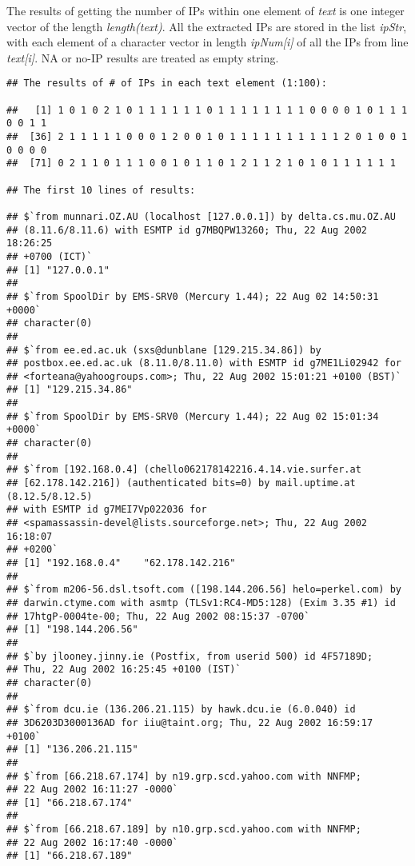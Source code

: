 \documentclass{article}\usepackage{graphicx, color}
\makeatletter
\newenvironment{kframe}{%
 \def\at@end@of@kframe{}%
 \ifinner\ifhmode%
  \def\at@end@of@kframe{\end{minipage}}%
  \begin{minipage}{\columnwidth}%
 \fi\fi%
 \def\FrameCommand##1{\hskip\@totalleftmargin \hskip-\fboxsep
 \colorbox{shadecolor}{##1}\hskip-\fboxsep
     \hskip-\linewidth \hskip-\@totalleftmargin \hskip\columnwidth}%
 \MakeFramed {\advance\hsize-\width
   \@totalleftmargin\z@ \linewidth\hsize
   \@setminipage}}%
 {\par\unskip\endMakeFramed%
 \at@end@of@kframe}
\newenvironment{knitrout}{}{} %
\makeatother
\begin{document}
The results of getting the number of IPs within one element of \textit{text} is one integer vector of 
the length \textit{length(text)}. All the extracted IPs are stored in the list \textit{ipStr}, 
with each element of a character vector in length \textit{ipNum[i]} of all the IPs from line \textit{text[i]}.
NA or no-IP results are treated as empty string.

\begin{knitrout}
\color{fgcolor}\begin{kframe}
\begin{verbatim}
## The results of # of IPs in each text element (1:100):

##   [1] 1 0 1 0 2 1 0 1 1 1 1 1 1 0 1 1 1 1 1 1 1 1 0 0 0 0 1 0 1 1 1 0 0 1 1
##  [36] 2 1 1 1 1 1 0 0 0 1 2 0 0 1 0 1 1 1 1 1 1 1 1 1 1 2 0 1 0 0 1 0 0 0 0
##  [71] 0 2 1 1 0 1 1 1 0 0 1 0 1 1 0 1 2 1 1 2 1 0 1 0 1 1 1 1 1 1

## The first 10 lines of results:

## $`from munnari.OZ.AU (localhost [127.0.0.1]) by delta.cs.mu.OZ.AU
## (8.11.6/8.11.6) with ESMTP id g7MBQPW13260; Thu, 22 Aug 2002 18:26:25
## +0700 (ICT)`
## [1] "127.0.0.1"
## 
## $`from SpoolDir by EMS-SRV0 (Mercury 1.44); 22 Aug 02 14:50:31 +0000`
## character(0)
## 
## $`from ee.ed.ac.uk (sxs@dunblane [129.215.34.86]) by
## postbox.ee.ed.ac.uk (8.11.0/8.11.0) with ESMTP id g7ME1Li02942 for
## <forteana@yahoogroups.com>; Thu, 22 Aug 2002 15:01:21 +0100 (BST)`
## [1] "129.215.34.86"
## 
## $`from SpoolDir by EMS-SRV0 (Mercury 1.44); 22 Aug 02 15:01:34 +0000`
## character(0)
## 
## $`from [192.168.0.4] (chello062178142216.4.14.vie.surfer.at
## [62.178.142.216]) (authenticated bits=0) by mail.uptime.at (8.12.5/8.12.5)
## with ESMTP id g7MEI7Vp022036 for
## <spamassassin-devel@lists.sourceforge.net>; Thu, 22 Aug 2002 16:18:07
## +0200`
## [1] "192.168.0.4"    "62.178.142.216"
## 
## $`from m206-56.dsl.tsoft.com ([198.144.206.56] helo=perkel.com) by
## darwin.ctyme.com with asmtp (TLSv1:RC4-MD5:128) (Exim 3.35 #1) id
## 17htgP-0004te-00; Thu, 22 Aug 2002 08:15:37 -0700`
## [1] "198.144.206.56"
## 
## $`by jlooney.jinny.ie (Postfix, from userid 500) id 4F57189D;
## Thu, 22 Aug 2002 16:25:45 +0100 (IST)`
## character(0)
## 
## $`from dcu.ie (136.206.21.115) by hawk.dcu.ie (6.0.040) id
## 3D6203D3000136AD for iiu@taint.org; Thu, 22 Aug 2002 16:59:17 +0100`
## [1] "136.206.21.115"
## 
## $`from [66.218.67.174] by n19.grp.scd.yahoo.com with NNFMP;
## 22 Aug 2002 16:11:27 -0000`
## [1] "66.218.67.174"
## 
## $`from [66.218.67.189] by n10.grp.scd.yahoo.com with NNFMP;
## 22 Aug 2002 16:17:40 -0000`
## [1] "66.218.67.189"
\end{verbatim}
\end{kframe}
\end{knitrout}
\end{document}
